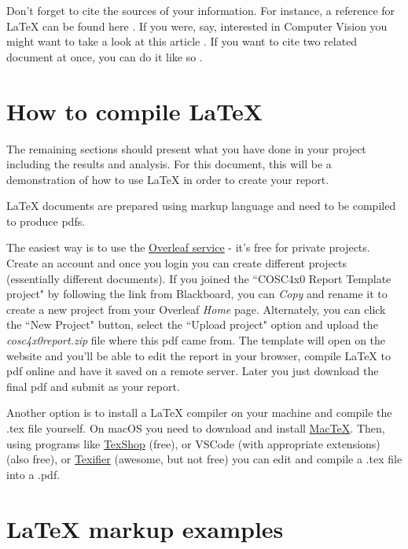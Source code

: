 \documentclass[12pt]{article}
\begin{document}
Don't forget to cite the sources of your information. For instance, a reference for \LaTeX{} can be found here \cite{latexcompanion}. If you were, say, interested in Computer Vision you might want to take a look at this article \cite{bettersift}. If you want to cite two related document at once, you can do it like so \cite{bettersift,sift}.

\section{How to compile \LaTeX{}}

The remaining sections should present what you have done in your project including the results and analysis. For this document, this will be a demonstration of how to use \LaTeX{} in order to create your report. 

\LaTeX{} documents are prepared using markup language and need to be compiled to produce pdfs. 

The easiest way is to use the \href{https://www.overleaf.com}{Overleaf service} - it's free for private projects. Create an account and once you login you can create different projects (essentially different documents). If you joined the ``COSC4x0 Report Template project" by following the link from Blackboard, you can \textit{Copy} and rename it to create a new project from your Overleaf \textit{Home} page. Alternately, you can click the ``New Project" button, select the ``Upload project" option and upload the \textit{cosc4x0report.zip} file where this pdf came from. The template will open on the website and you'll be able to edit the report in your browser, compile LaTeX to pdf online and have it saved on a remote server. Later you just download the final pdf and submit as your report.   

Another option is to install a LaTeX compiler on your machine and compile the .tex file yourself. On macOS you need to download and install \href{http://www.tug.org/mactex/downloading.html}{MacTeX}. Then, using programs like \href{http://pages.uoregon.edu/koch/texshop/}{TexShop} (free), or VSCode (with appropriate extensions) (also free), or \href{https://www.texifier.com/}{Texifier} (awesome, but not free) you can edit and compile a .tex file into a .pdf.

\section{\LaTeX{} markup examples}
\label{sec:examples}
 
\end{document}
